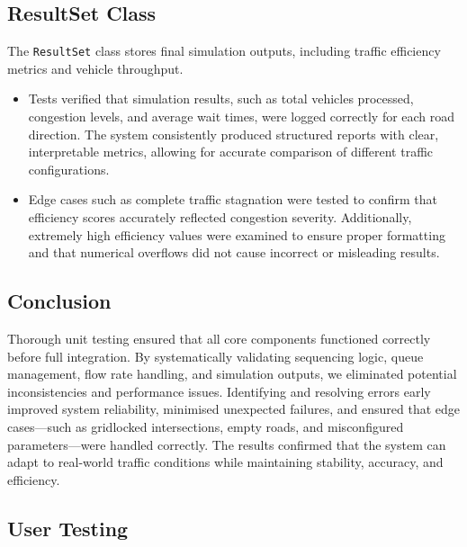 \documentclass{article}
\begin{document}
    \subsection*{ResultSet Class}
    The \texttt{ResultSet} class stores final simulation outputs, including traffic efficiency metrics and vehicle throughput.
    \begin{itemize}
        \item Tests verified that simulation results, such as total vehicles processed, congestion levels, and average wait times, were logged correctly for each road direction. The system consistently produced structured reports with clear, interpretable metrics, allowing for accurate comparison of different traffic configurations.
        \item Edge cases such as complete traffic stagnation were tested to confirm that efficiency scores accurately reflected congestion severity. Additionally, extremely high efficiency values were examined to ensure proper formatting and that numerical overflows did not cause incorrect or misleading results.
    \end{itemize}

    \subsection*{Conclusion}
    Thorough unit testing ensured that all core components functioned correctly before full integration. By systematically validating sequencing logic, queue management, flow rate handling, and simulation outputs, we eliminated potential inconsistencies and performance issues. Identifying and resolving errors early improved system reliability, minimised unexpected failures, and ensured that edge cases—such as gridlocked intersections, empty roads, and misconfigured parameters—were handled correctly. The results confirmed that the system can adapt to real-world traffic conditions while maintaining stability, accuracy, and efficiency.

    \subsection{User Testing}
\end{document}
